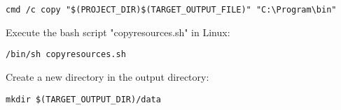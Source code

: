 \begin{lstlisting}
cmd /c copy "$(PROJECT_DIR)$(TARGET_OUTPUT_FILE)" "C:\Program\bin"
\end{lstlisting}

Execute the bash script "copyresources.sh" in Linux:

\begin{lstlisting}
/bin/sh copyresources.sh
\end{lstlisting}

Create a new directory in the output directory:

\begin{lstlisting}
mkdir $(TARGET_OUTPUT_DIR)/data
\end{lstlisting}  
